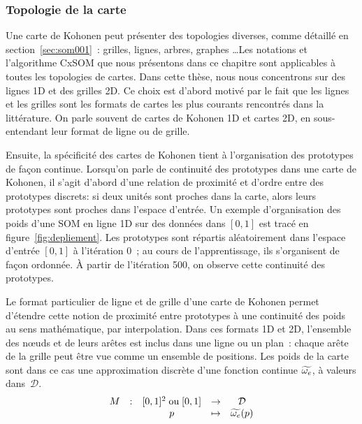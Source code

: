 \documentclass[../main]{subfiles}
\begin{document}
\subsubsection{Topologie de la carte}

Une carte de Kohonen peut présenter des topologies diverses, comme détaillé en section~\ref{sec:som001}~: grilles, lignes, arbres, graphes \dots Les notations et l'algorithme CxSOM que nous présentons dans ce chapitre sont applicables à toutes les topologies de cartes. Dans cette thèse, nous nous concentrons sur des lignes 1D et des grilles 2D. Ce choix est d'abord motivé par le fait que les lignes et les grilles sont les formats de cartes les plus courants rencontrés dans la littérature. On parle souvent de cartes de Kohonen 1D et cartes 2D, en sous-entendant leur format de ligne ou de grille.

Ensuite, la spécificité des cartes de Kohonen tient à l'organisation des prototypes de façon continue. Lorsqu'on parle de continuité des prototypes dans une carte de Kohonen, il s'agit d'abord d'une relation de proximité et d'ordre entre des prototypes discrets: si deux unités sont proches dans la carte, alors leurs prototypes sont proches dans l'espace d'entrée. Un exemple d'organisation des poids d'une SOM en ligne 1D sur des données dans $[0,1]$ est tracé en figure~\ref{fig:depliement}. Les prototypes sont répartis aléatoirement dans l'espace d'entrée $[0,1]$ à l'itération $0$~; au cours de l'apprentissage, ils s'organisent de façon ordonnée. \`A partir de l'itération 500, on observe cette continuité des prototypes.

Le format particulier de ligne et de grille d'une carte de Kohonen permet d'étendre cette notion de proximité entre prototypes à une continuité des poids au sens mathématique, par interpolation. Dans ces formats 1D et 2D, l'ensemble des n\oe{}uds et de leurs arêtes est inclus dans une ligne ou un plan~: chaque arête de la grille peut être vue comme un ensemble de positions. Les poids de la carte sont dans ce cas une approximation discrète d'une fonction continue $\widetilde{\omega_e}$, à valeurs dans~$\mathcal{D}$.
\begin{equation*}
\begin{array}{ccccc}
M& : & [0,1]^2 \; \text{ou} \;[0,1] & \to &  \mathcal{D} \\
 & & p & \mapsto & \widetilde{\omega_e}(p) \\
\end{array}
\end{equation*}
\end{document}
